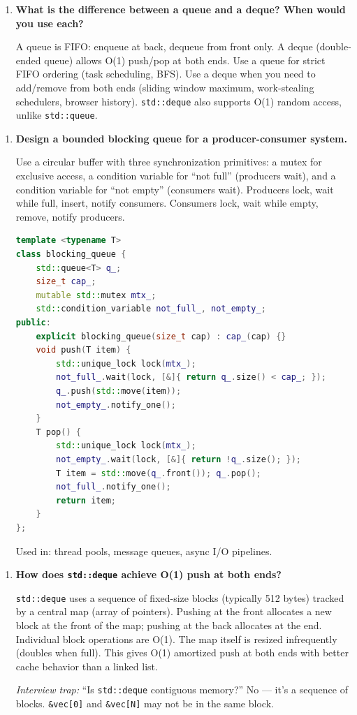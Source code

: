 \begin{enumerate}
\item \textbf{What is the difference between a queue and a deque? When would you use each?}

A queue is FIFO: enqueue at back, dequeue from front only. A deque (double-ended queue) allows O(1) push/pop at both ends. Use a queue for strict FIFO ordering (task scheduling, BFS). Use a deque when you need to add/remove from both ends (sliding window maximum, work-stealing schedulers, browser history). \texttt{std::deque} also supports O(1) random access, unlike \texttt{std::queue}.
\end{enumerate}

\begin{enumerate}
\item \textbf{Design a bounded blocking queue for a producer-consumer system.}

Use a circular buffer with three synchronization primitives: a mutex for exclusive access, a condition variable for ``not full'' (producers wait), and a condition variable for ``not empty'' (consumers wait). Producers lock, wait while full, insert, notify consumers. Consumers lock, wait while empty, remove, notify producers.

\begin{lstlisting}[language=C++]
template <typename T>
class blocking_queue {
    std::queue<T> q_;
    size_t cap_;
    mutable std::mutex mtx_;
    std::condition_variable not_full_, not_empty_;
public:
    explicit blocking_queue(size_t cap) : cap_(cap) {}
    void push(T item) {
        std::unique_lock lock(mtx_);
        not_full_.wait(lock, [&]{ return q_.size() < cap_; });
        q_.push(std::move(item));
        not_empty_.notify_one();
    }
    T pop() {
        std::unique_lock lock(mtx_);
        not_empty_.wait(lock, [&]{ return !q_.size(); });
        T item = std::move(q_.front()); q_.pop();
        not_full_.notify_one();
        return item;
    }
};
\end{lstlisting}

Used in: thread pools, message queues, async I/O pipelines.
\end{enumerate}

\begin{enumerate}
\item \textbf{How does \texttt{std::deque} achieve O(1) push at both ends?}

\texttt{std::deque} uses a sequence of fixed-size blocks (typically 512 bytes) tracked by a central map (array of pointers). Pushing at the front allocates a new block at the front of the map; pushing at the back allocates at the end. Individual block operations are O(1). The map itself is resized infrequently (doubles when full). This gives O(1) amortized push at both ends with better cache behavior than a linked list.

\textit{Interview trap:} ``Is \texttt{std::deque} contiguous memory?'' No — it's a sequence of blocks. \texttt{\&vec[0]} and \texttt{\&vec[N]} may not be in the same block.
\end{enumerate}

